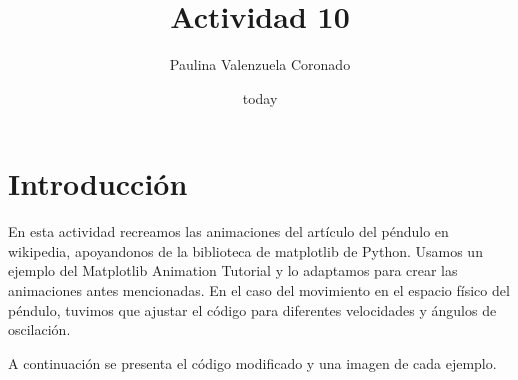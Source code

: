 \documentclass[12pt]{article}
\title{Actividad 10}
\author{Paulina Valenzuela Coronado}
\date{today}
\begin{document}
\maketitle
\section{Introducción}
En esta actividad recreamos las animaciones del artículo del péndulo en wikipedia\cite{P}, apoyandonos de la biblioteca de matplotlib de Python.
Usamos un ejemplo del Matplotlib Animation Tutorial\cite{A} y lo adaptamos para crear las animaciones antes mencionadas.
En el caso del movimiento en el espacio físico del péndulo, tuvimos que ajustar el código para diferentes velocidades y ángulos de oscilación.

A continuación se presenta el código modificado y una imagen de cada ejemplo.
\end{document}
